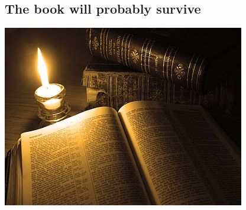 \documentclass[%
oneside,                 %
final,                   %
10pt]{article}
\begin{document}
\vspace{6mm}
\subsection{The book will probably survive}
\vspace{6mm}
\centerline{\includegraphics[width=0.9\linewidth]{testfigs/oldbooks.jpg}}
\vspace{6mm}
\end{document}
